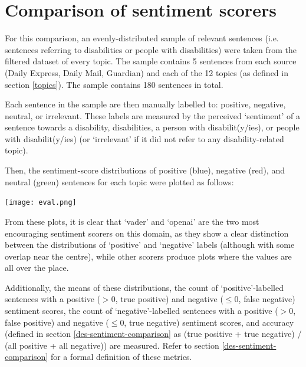 \documentclass{report}
\begin{document}
\section{Comparison of sentiment scorers} \label{Comparison of sentiment scorers}
For this comparison, an evenly-distributed sample of relevant sentences (i.e. sentences referring to disabilities or people with disabilities) were taken from the filtered dataset of every topic. 
The sample contains 5 sentences from each source (Daily Express, Daily Mail, Guardian) and each of the 12 topics (as defined in section \ref{topics}). %
The sample contains 180 sentences in total. %

Each sentence in the sample are then manually labelled to: positive, negative, neutral, or irrelevant.
These labels are measured by the perceived `sentiment' of a sentence towards a disability, disabilities, a person with disabilit(y/ies), or people with disabilit(y/ies) (or `irrelevant' if it did not refer to any disability-related topic).

Then, the sentiment-score distributions of positive (blue), negative (red), and neutral (green) sentences for each topic were plotted as follows:

\noindent
\texttt{[image: eval.png]}

From these plots, it is clear that `vader' \cite{VADER} and `openai' \cite{OpenAI} are the two most encouraging sentiment scorers on this domain, as they show a clear distinction between the distributions of `positive' and `negative' labels (although with some overlap near the centre), while other scorers produce plots where the values are all over the place.

Additionally, the means of these distributions, the count of `positive'-labelled sentences with a positive ($>$0, true positive) and negative ($\le$0, false negative) sentiment scores, the count of `negative'-labelled sentences with a positive ($>$0, false positive) and negative ($\le$0, true negative) sentiment scores, and accuracy (defined in section \ref{des-sentiment-comparison} as (true positive + true negative) / (all positive + all negative)) are measured.
Refer to section \ref{des-sentiment-comparison} for a formal definition of these metrics.
\end{document}
